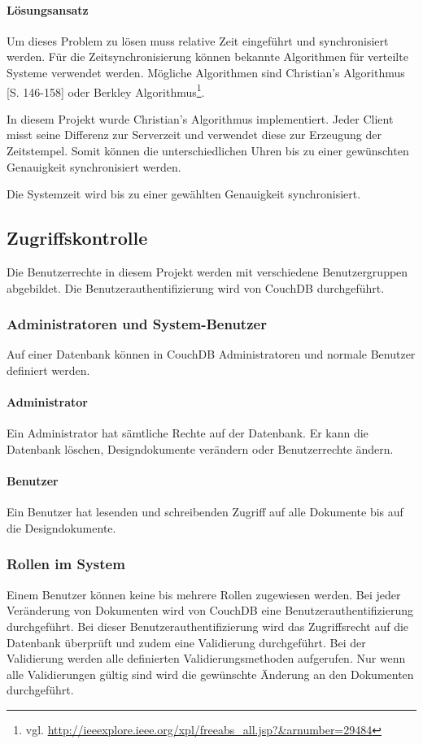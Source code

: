 \paragraph{Lösungsansatz} Um dieses Problem zu lösen muss relative Zeit eingeführt und
	synchronisiert werden. Für die Zeitsynchronisierung können bekannte Algorithmen
	für verteilte Systeme verwendet werden. Mögliche Algorithmen sind Christian's
	Algorithmus \cite{Christian89}[S. 146-158] oder Berkley Algorithmus\footnote{vgl.
	\url{http://ieeexplore.ieee.org/xpl/freeabs_all.jsp?&arnumber=29484}}.

In diesem Projekt wurde Christian's Algorithmus implementiert. Jeder Client misst seine
	Differenz zur Serverzeit und verwendet diese zur Erzeugung der Zeitstempel. Somit
	können die unterschiedlichen Uhren bis zu einer gewünschten Genauigkeit
	synchronisiert werden.

Die Systemzeit wird bis zu einer gewählten Genauigkeit synchronisiert.

\subsection{Zugriffskontrolle}

Die Benutzerrechte in diesem Projekt werden mit verschiedene Benutzergruppen abgebildet.
	Die Benutzerauthentifizierung wird von CouchDB durchgeführt.

\subsubsection{Administratoren und System-Benutzer}

Auf einer Datenbank können in CouchDB Administratoren und normale Benutzer definiert
	werden.	
	
\paragraph{Administrator} Ein Administrator hat sämtliche Rechte auf der Datenbank.
	Er kann die Datenbank löschen, Designdokumente verändern oder Benutzerrechte ändern.
	
\paragraph{Benutzer} Ein Benutzer hat lesenden und schreibenden Zugriff auf
	alle Dokumente bis auf die Designdokumente.

\subsubsection{Rollen im System}

Einem Benutzer können keine bis mehrere Rollen zugewiesen werden. Bei jeder Veränderung
	von Dokumenten wird von CouchDB eine Benutzerauthentifizierung
	durchgeführt. Bei dieser Benutzerauthentifizierung wird das Zugriffsrecht auf die
	Datenbank überprüft und zudem eine Validierung durchgeführt. Bei der Validierung
	werden alle definierten Validierungsmethoden aufgerufen. Nur wenn alle Validierungen
	gültig sind wird die gewünschte Änderung an den Dokumenten durchgeführt.